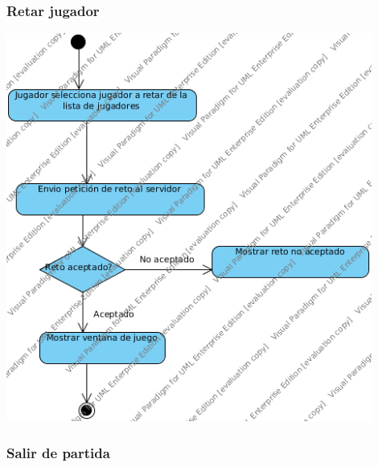 \documentclass[a4paper,11pt,oneside]{article}
\begin{document}
\subsubsection{Retar jugador}

\includegraphics[width=0.9\textwidth]{img/ms_RetarJugadorCliente.png}\\[1cm]

\subsubsection{Salir de partida}
\end{document}
